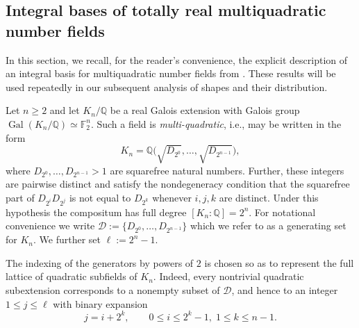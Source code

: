 \documentclass{amsart}
\newcommand{\Q}{\mathbb{Q}}
\newcommand{\F}{\mathbb{F}}
\newcommand{\op}[1]{\operatorname{#1}}
\theoremstyle{plain}
\theoremstyle{definition}
\theoremstyle{remark}
\numberwithin{equation}{section}
\begin{document}
\subsection{Integral bases of totally real multiquadratic number fields}
\par 
In this section, we recall, for the reader’s convenience, the explicit description of an integral basis for multiquadratic number fields from \cite{Man}. These results will be used repeatedly in our subsequent analysis of shapes and their distribution.

\par
Let $n \ge 2$ and let $K_n/\Q$ be a real Galois extension with Galois group
$\op{Gal}(K_n/\Q)\simeq \F_2^n$. 
Such a field is \emph{multi-quadratic}, i.e., may be written in the form
\begin{equation}\label{defn of K} K_n=\Q\bigl(\sqrt{D_{2^0}},\ldots,\sqrt{D_{2^{n-1}}}\bigr),
\end{equation}
where $D_{2^0},\ldots,D_{2^{n-1}}>1$ are squarefree natural numbers. Further, these integers are pairwise distinct and satisfy the nondegeneracy condition that the squarefree part of $D_{2^i}D_{2^j}$ is not equal to $D_{2^k}$ whenever $i,j,k$ are distinct.  
Under this hypothesis the compositum has full degree $[K_n:\Q]=2^n$. For notational convenience we write $\mathcal D := \{D_{2^0},\ldots,D_{2^{n-1}}\}$ which we refer to as a generating set for $K_n$. We further set $\ell := 2^n-1$.

The indexing of the generators by powers of $2$ is chosen so as to represent the full lattice of quadratic subfields of $K_n$.  
Indeed, every nontrivial quadratic subextension corresponds to a nonempty subset of $\mathcal D$, and hence to an integer $1\le j\le \ell$ with binary expansion
\[
j=i+2^k,\qquad 0\le i\le 2^k-1,\; 1\le k\le n-1 .
\]
\end{document}
